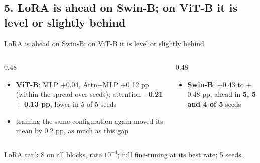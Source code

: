 \documentclass[aspectratio=169,11pt]{beamer}
\newcommand{\figH}{5.0cm}
\newcommand{\src}[1]{\par\vfill{\tiny\color{cGrey}#1\par}}
\begin{document}
\subsection{5. LoRA is ahead on Swin-B; on ViT-B it is level or slightly behind}
\begin{frame}{LoRA is ahead on Swin-B; on ViT-B it is level or slightly behind}
\vspace{-1mm}
{\renewcommand{\figH}{4.5cm}\centering\par}
\vspace{1mm}
\vspace{-1mm}
\begin{columns}[T]
\begin{column}{0.48\textwidth}
\footnotesize
\begin{itemize}
  \item \textbf{ViT-B}: MLP $+$0.04, Attn+MLP $+$0.12 pp (within the spread over seeds); attention \textbf{$-$0.21 $\pm$ 0.13 pp}, lower in 5 of 5 seeds
  \item training the same configuration again moved its mean by 0.2 pp, as much as this gap
\end{itemize}
\end{column}
\begin{column}{0.48\textwidth}
\footnotesize
\begin{itemize}
  \item \textbf{Swin-B}: $+$0.43 to $+$0.48 pp, ahead in \textbf{5, 5 and 4 of 5} seeds
\end{itemize}
\end{column}
\end{columns}
\src{LoRA rank 8 on all blocks, rate $10^{-4}$; full fine-tuning at its best rate; 5 seeds.}
\end{frame}

\end{document}
